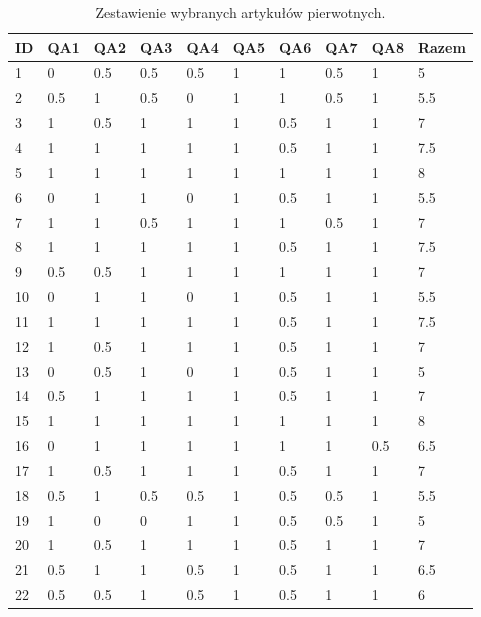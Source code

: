\begin{table}[htbp!]
\caption{Zestawienie wybranych artykułów pierwotnych.}
\label{tab:QA_res}
\begin{tabular}{p{3cm} p{1cm} p{1cm} p{1cm} p{1cm} p{1cm} p{1cm} p{1cm} p{1cm} p{1cm}}
\hline
\textbf{ID} & \textbf{QA1} & \textbf{QA2} & \textbf{QA3} & \textbf{QA4} & \textbf{QA5} & \textbf{QA6} & \textbf{QA7} & \textbf{QA8} & \textbf{Razem} \\ \hline
1 \cite{PBTA4SM} & 0 & 0.5 & 0.5 & 0.5 & 1 & 1 & 0.5 & 1 & 5 \\ \hline
2 \cite{orchestration2026} & 0.5 & 1 & 0.5 & 0 & 1 & 1 & 0.5 & 1 & 5.5 \\ \hline
3 \cite{dualTask2023} & 1 & 0.5 & 1 & 1 & 1 & 0.5 & 1 & 1 & 7 \\ \hline
4 \cite{HRC2020} & 1 & 1 & 1 & 1 & 1 & 0.5 & 1 & 1 & 7.5 \\ \hline
5 \cite{endline2025} & 1 & 1 & 1 & 1 & 1 & 1 & 1 & 1 & 8 \\ \hline
6 \cite{hierarchy2024} & 0 & 1 & 1 & 0 & 1 & 0.5 & 1 & 1 & 5.5 \\ \hline
7 \cite{exocortex2024} & 1 & 1 & 0.5 & 1 & 1 & 1 & 0.5 & 1 & 7 \\ \hline
8 \cite{JSHM2026} & 1 & 1 & 1 & 1 & 1 & 0.5 & 1 & 1 & 7.5 \\ \hline
9 \cite{tourist2025} & 0.5 & 0.5 & 1 & 1 & 1 & 1 & 1 & 1 & 7 \\ \hline
10 \cite{future2025} & 0 & 1 & 1 & 0 & 1 & 0.5 & 1 & 1 & 5.5 \\ \hline
11 \cite{fatigue2025} & 1 & 1 & 1 & 1 & 1 & 0.5 & 1 & 1 & 7.5 \\ \hline
12 \cite{education2022} & 1 & 0.5 & 1 & 1 & 1 & 0.5 & 1 & 1 & 7 \\ \hline
13 \cite{novelHCR2025} & 0 & 0.5 & 1 & 0 & 1 & 0.5 & 1 & 1 & 5 \\ \hline
14 \cite{bayesian2024} & 0.5 & 1 & 1 & 1 & 1 & 0.5 & 1 & 1 & 7 \\ \hline
15 \cite{inTimeRL2021} & 1 & 1 & 1 & 1 & 1 & 1 & 1 & 1 & 8 \\ \hline
16 \cite{LLM2025} & 0 & 1 & 1 & 1 & 1 & 1 & 1 & 0.5 & 6.5 \\ \hline
17 \cite{workLifeBalance2023} & 1 & 0.5 & 1 & 1 & 1 & 0.5 & 1 & 1 & 7 \\ \hline
18 \cite{hospitality2025} & 0.5 & 1 & 0.5 & 0.5 & 1 & 0.5 & 0.5 & 1 & 5.5 \\ \hline
19 \cite{gap2024} & 1 & 0 & 0 & 1 & 1 & 0.5 & 0.5 & 1 & 5 \\ \hline
20 \cite{TaskAllocation2024} & 1 & 0.5 & 1 & 1 & 1 & 0.5 & 1 & 1 & 7 \\ \hline
21 \cite{twin2025} & 0.5 & 1 & 1 & 0.5 & 1 & 0.5 & 1 & 1 & 6.5 \\ \hline
22 \cite{competenceTimeQuality2020} & 0.5 & 0.5 & 1 & 0.5 & 1 & 0.5 & 1 & 1 & 6 \\ \hline
\end{tabular}
\end{table}


